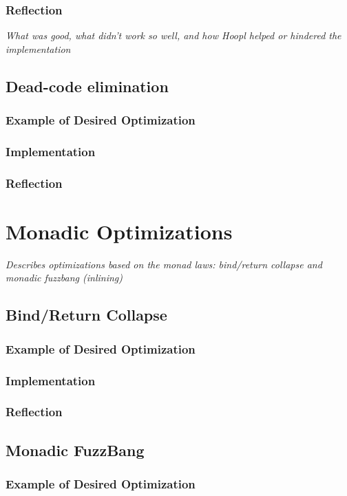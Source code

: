 \documentclass[11pt]{article}
\begin{document}
\subsubsection{Reflection}
\emph{What was good, what didn't work so well, and how Hoopl helped
or hindered the implementation}

\subsection{Dead-code elimination}
\subsubsection{Example of Desired Optimization}
\subsubsection{Implementation}
\subsubsection{Reflection}

\section{Monadic Optimizations}
\emph{Describes optimizations based on the monad laws: bind/return collapse and
  monadic fuzzbang (inlining)}

\subsection{Bind/Return Collapse}
\subsubsection{Example of Desired Optimization}
\subsubsection{Implementation}
\subsubsection{Reflection}

\subsection{Monadic FuzzBang}
\subsubsection{Example of Desired Optimization}
\end{document}
